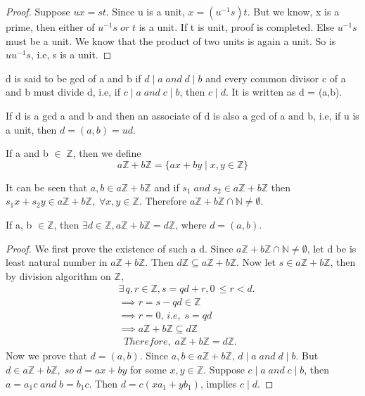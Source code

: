 \documentclass[10pt,a4paper]{article}
\begin{document}
\begin{proof}
Suppose $ux=st$. Since u is a unit, $x=(u^{-1}s)t$. But we know, x is a prime, then either of $u^{-1}s \; or \; t$ is a unit. If t is unit, proof is completed. Else $u^{-1}s$ must be a unit. We know that the product of two units is again a unit. So is $uu^{-1}s$, i.e, s is a unit.
\end{proof}

\begin{mydef}
d is said to be gcd of a and b if $d\mid a\;and\;d\mid b$ and every common divisor c of a and b must divide d, i.e, if $c\mid a\;and\;c\mid b$, then $c\mid d$. It is written as d = (a,b).
\end{mydef}

\begin{remark}
If d is a gcd a and b and then an associate of d is also a gcd of a and b, i.e, if u is a unit, then $d = (a,b) = ud$.
\end{remark}

\begin{mydef}
If a and b $\in\; \mathbb{Z}$, then we define $$a\mathbb{Z}+b\mathbb{Z} = \{ax+by\mid x, y\in\mathbb{Z}\}$$
\end{mydef}

\begin{remark}
It can be seen that $a,b \in a\mathbb{Z}+b\mathbb{Z}$ and if $s_{1} \;and\; s_{2} \in a\mathbb{Z}+b\mathbb{Z}$ then $s_{1}x+s_{2}y \in a\mathbb{Z}+b\mathbb{Z},\; \forall x,y \in\mathbb{Z}$. Therefore $a\mathbb{Z}+b\mathbb{Z} \cap \mathbb{N} \neq \emptyset$.
\end{remark}

\begin{theorem}
If a, b $\in \mathbb{Z}$, then $\exists d \in \mathbb{Z}, a\mathbb{Z}+b\mathbb{Z} = d\mathbb{Z}\text{, where }d = (a,b).$
\end{theorem}

\begin{proof}
We first prove the existence of such a d. Since $a\mathbb{Z}+b\mathbb{Z} \cap \mathbb{N} \neq \emptyset$, let d be is least natural number in $a\mathbb{Z}+b\mathbb{Z}$. Then $d\mathbb{Z} \subseteq a\mathbb{Z}+b\mathbb{Z}$. Now let $s \in a\mathbb{Z}+b\mathbb{Z}$, then by division algorithm on $\mathbb{Z},$ 
\begin{align*}
&\exists \,q,r \in \mathbb{Z}, s = qd+r, 0\,\le r < d. \\
&\implies r = s-qd \in \mathbb{Z} \\
&\implies r = 0,\, i.e,\; s = qd \\
&\implies a\mathbb{Z}+b\mathbb{Z} \subseteq d\mathbb{Z} \\
& \;\;Therefore,\; a\mathbb{Z}+b\mathbb{Z} = d\mathbb{Z}.
\end{align*}
Now we prove that $d  = (a,b)$. Since $a,b \in a\mathbb{Z}+b\mathbb{Z},\, d\mid a \;and\; d\mid b$. But $d \in a\mathbb{Z}+b\mathbb{Z}, \;so\; d=ax+by$ for some $x,y\in\mathbb{Z}$. Suppose $c\mid a\;and\;c\mid b$, then $a = a_{1}c \;and\; b=b_{1}c$. Then $d = c(xa_{1}+yb_{1})$, implies $c\mid d$.
\end{proof}
\end{document}
